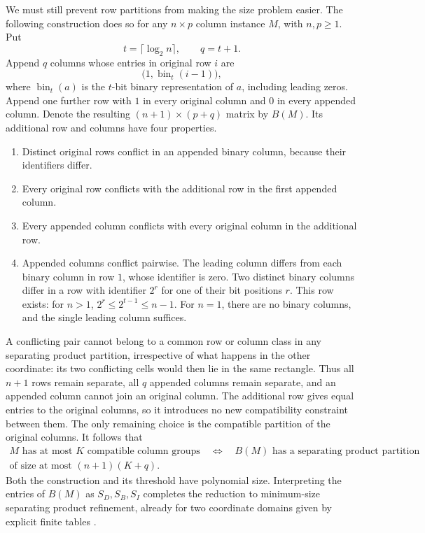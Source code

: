 We must still prevent row partitions from making the size problem easier.
The following construction does so for any \(n\times p\) column instance
\(M\), with \(n,p\geq1\). Put
\[
 t=\lceil\log_2 n\rceil,\qquad q=t+1.
\]
Append \(q\) columns whose entries in original row \(i\) are
\[
 \bigl(1,\operatorname{bin}_t(i-1)\bigr),
\]
where \(\operatorname{bin}_t(a)\) is the \(t\)-bit binary representation
of \(a\), including leading zeros. Append one further row with \(1\) in
every original column and \(0\) in every appended column. Denote the
resulting \((n+1)\times(p+q)\) matrix by \(B(M)\).
Its additional row and columns have four properties.
\begin{enumerate}
\item Distinct original rows conflict in an appended binary column, because
their identifiers differ.
\item Every original row conflicts with the additional row in the first
appended column.
\item Every appended column conflicts with every original column in the
additional row.
\item Appended columns conflict pairwise. The leading column differs from
each binary column in row \(1\), whose identifier is zero. Two distinct
binary columns differ in a row with identifier \(2^r\) for one of their
bit positions \(r\). This row exists: for \(n>1\),
\(2^r\leq2^{t-1}\leq n-1\). For \(n=1\), there are no binary columns,
and the single leading column suffices.
\end{enumerate}
A conflicting pair cannot belong to a common row or column class in any
separating product partition, irrespective of what happens in the other
coordinate: its two conflicting cells would then lie in the same
rectangle. Thus all \(n+1\) rows remain separate, all \(q\) appended
columns remain separate, and an appended column cannot join an original
column. The additional row gives equal entries to the original columns,
so it introduces no new compatibility constraint between them. The only
remaining choice is the compatible partition of the original columns.
It follows that
\[
 \begin{split}
 M\text{ has at most }K\text{ compatible column groups}
 \quad\Longleftrightarrow\quad
 B(M)\text{ has a separating product partition}\\
 \text{of size at most }(n+1)(K+q).
 \end{split}
\]
Both the construction and its threshold have polynomial size. Interpreting
the entries of \(B(M)\) as \(S_D,S_B,S_I\) completes the reduction to
minimum-size separating product refinement, already for two coordinate
domains given by explicit finite tables
\cite[thm.~4.17 and \S5]{ClarkeEtAl2003}.


